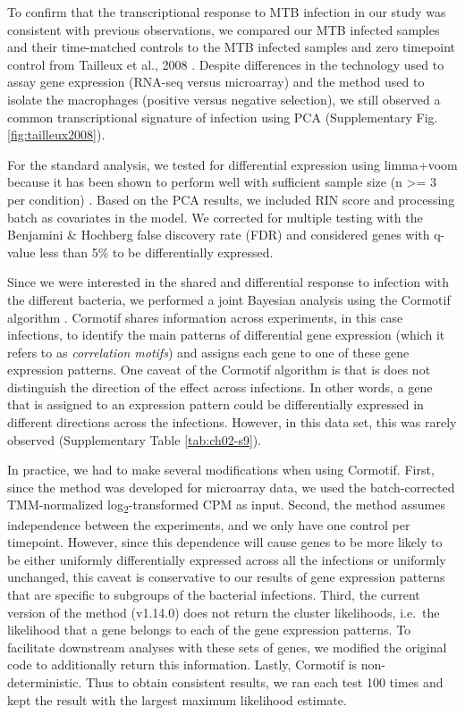 To confirm that the transcriptional response to MTB infection in our
study was consistent with previous observations, we compared our MTB
infected samples and their time-matched controls to the MTB infected
samples and zero timepoint control from Tailleux et al., 2008
\citep{Tailleux2008}. Despite differences in the technology used to assay
gene expression (RNA-seq versus microarray) and the method used to
isolate the macrophages (positive versus negative selection), we still
observed a common transcriptional signature of infection using PCA
(Supplementary Fig. \ref{fig:tailleux2008}).

For the standard analysis, we tested for differential expression using
limma+voom \citep{Smyth2004, Smyth2005, Law2014} because it has been
shown to perform well with sufficient sample size (n \textgreater{}= 3
per condition) \citep{Rapaport2013, Soneson2013}. Based on the PCA
results, we included RIN score and processing batch as covariates in the
model. We corrected for multiple testing with the Benjamini \& Hochberg
false discovery rate (FDR) \citep{Benjamini1995} and considered genes
with q-value less than 5\% to be differentially expressed.

Since we were interested in the shared and differential response to
infection with the different bacteria, we performed a joint Bayesian
analysis using the Cormotif algorithm \citep{Wei2015}. Cormotif shares
information across experiments, in this case infections, to identify the
main patterns of differential gene expression (which it refers to as
\emph{correlation motifs}) and assigns each gene to one of these gene
expression patterns. One caveat of the Cormotif algorithm is that is
does not distinguish the direction of the effect across infections. In
other words, a gene that is assigned to an expression pattern could be
differentially expressed in different directions across the infections.
However, in this data set, this was rarely observed (Supplementary Table
\ref{tab:ch02-s9}).

In practice, we had to make several modifications when using Cormotif.
First, since the method was developed for microarray data, we used the
batch-corrected TMM-normalized log\textsubscript{2}-transformed CPM as
input. Second, the method assumes independence between the experiments,
and we only have one control per timepoint. However, since this
dependence will cause genes to be more likely to be either uniformly
differentially expressed across all the infections or uniformly
unchanged, this caveat is conservative to our results of gene expression
patterns that are specific to subgroups of the bacterial infections.
Third, the current version of the method (v1.14.0) does not return the
cluster likelihoods, i.e.~the likelihood that a gene belongs to each of
the gene expression patterns. To facilitate downstream analyses with
these sets of genes, we modified the original code to additionally
return this information. Lastly, Cormotif is non-deterministic. Thus to
obtain consistent results, we ran each test 100 times and kept the
result with the largest maximum likelihood estimate.

